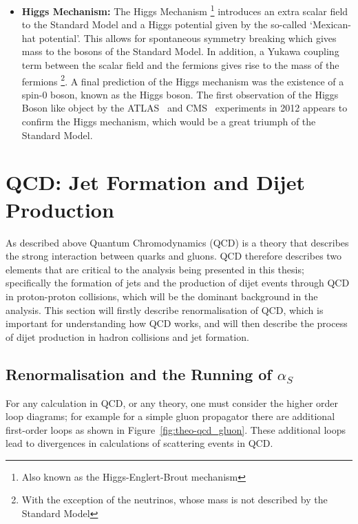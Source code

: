 \begin{itemize}[leftmargin=*]
\item\textbf{Higgs Mechanism:}
  The Higgs Mechanism \footnote{Also known as the Higgs-Englert-Brout mechanism}
  introduces an extra scalar field to the Standard Model
  and a Higgs potential given by the so-called `Mexican-hat potential'.
  This allows for spontaneous symmetry breaking which gives mass to the bosons of the Standard Model.
  In addition, a Yukawa coupling term between the scalar field and the fermions gives rise to the mass of the fermions
  \footnote{With the exception of the neutrinos, whose mass is not described by the Standard Model}.
  A final prediction of the Higgs mechanism was the existence of a spin-0 boson, known as the Higgs boson.
  The first observation of the Higgs Boson like object by the ATLAS~\cite{theo-higgs_atlas} and CMS~\cite{theo-higgs_cms} experiments
  in 2012 appears to confirm the Higgs mechanism, which would be a great triumph of the Standard Model.
\end{itemize}

\section{QCD: Jet Formation and Dijet Production}
\label{theo-qcd}

As described above Quantum Chromodynamics (QCD) is a theory that describes the strong interaction between
quarks and gluons.
QCD therefore describes two elements that are critical to the analysis being presented in this thesis;
specifically the formation of jets and the production of dijet events through QCD in proton-proton collisions,
which will be the dominant background in the analysis.
This section will firstly describe renormalisation of QCD, which is important for understanding how QCD works,
and will then describe the process of dijet production in hadron collisions and jet formation.

\subsection{Renormalisation and the Running of $\alpha_S$}

For any calculation in QCD, or any theory, one must consider the higher order loop diagrams;
for example for a simple gluon propagator there are additional first-order loops as shown in Figure~\ref{fig:theo-qcd_gluon}.
These additional loops lead to divergences in calculations of scattering events in QCD.

